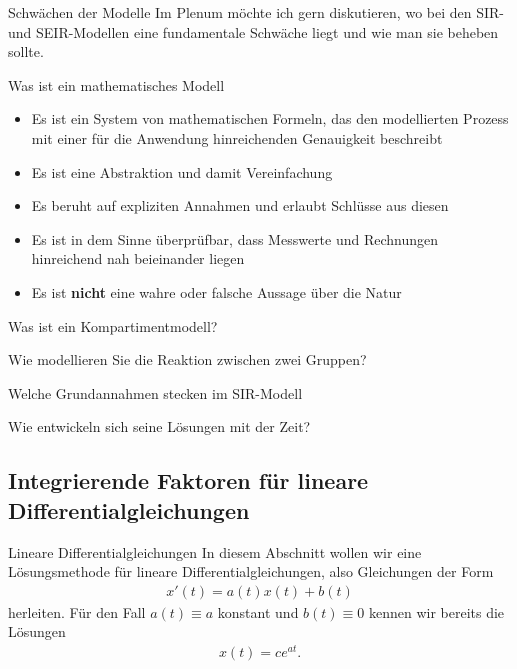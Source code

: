 \begin{frame}{Schwächen der Modelle}
  Im Plenum möchte ich gern diskutieren, wo bei den SIR- und
  SEIR-Modellen eine fundamentale Schwäche liegt und wie man sie
  beheben sollte.
\end{frame}

\begin{frame}{Was ist ein mathematisches Modell}
  \begin{itemize}
  \item Es ist ein System von mathematischen Formeln, das den
    modellierten Prozess mit einer für die Anwendung hinreichenden
    Genauigkeit beschreibt
  \item Es ist eine Abstraktion und damit Vereinfachung
  \item Es beruht auf expliziten Annahmen und erlaubt Schlüsse aus diesen
  \item Es ist in dem Sinne überprüfbar, dass Messwerte und Rechnungen
    hinreichend nah beieinander liegen
  \item Es ist \textbf{nicht} eine wahre oder falsche Aussage über die Natur
  \end{itemize}
\end{frame}

\begin{Abschluss}
\item Was ist ein Kompartimentmodell?
\item Wie modellieren Sie die \glqq{}Reaktion\grqq{} zwischen zwei Gruppen?
\item Welche Grundannahmen stecken im SIR-Modell
\item Wie entwickeln sich seine Lösungen mit der Zeit?
\end{Abschluss}

\subsection{Integrierende Faktoren für lineare Differentialgleichungen}

\begin{frame}{Lineare Differentialgleichungen}
  In diesem Abschnitt wollen wir eine Lösungsmethode für lineare
  Differentialgleichungen, also Gleichungen der Form
  \begin{gather*}
    x'(t) = a(t) x(t) + b(t)
  \end{gather*}
  herleiten. Für den Fall $a(t)\equiv a$ konstant und $b(t)\equiv 0$
  kennen wir bereits die Lösungen
  \begin{gather*}
    x(t) = c e^{at}.
  \end{gather*}
\end{frame}

